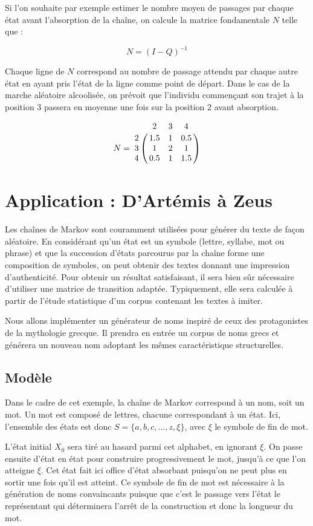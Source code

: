 \documentclass[12pt]{article}
\begin{document}
Si l'on souhaite par exemple estimer le nombre moyen de passages par
chaque état avant l'absorption de la chaîne, on calcule la matrice
fondamentale $N$ telle que :

$$
N = (I - Q)^{-1}
$$

Chaque ligne de $N$ correspond au nombre de passage attendu par chaque
autre état en ayant pris l'état de la ligne comme point de
départ. Dans le cas de la marche aléatoire alcoolisée, on prévoit que
l'individu commençant son trajet à la position 3 passera en moyenne
une fois sur la position 2 avant absorption.

$$
N =
\bordermatrix{
  & 2 & 3 & 4 \cr
  2 & 1.5 & 1 & 0.5 \cr
  3 & 1 & 2 & 1 \cr
  4 & 0.5 & 1 & 1.5
}
$$

\section{Application : D'Artémis à Zeus}

Les chaînes de Markov sont couramment utilisées pour générer du texte
de façon aléatoire. En considérant qu'un état est un symbole (lettre,
syllabe, mot ou phrase) et que la succession d'états parcourus par la
chaîne forme une composition de symboles, on peut obtenir des textes
donnant une impression d'authenticité. Pour obtenir un résultat
satisfaisant, il sera bien sûr nécessaire d'utiliser une matrice de
transition adaptée. Typiquement, elle sera calculée à partir de
l'étude statistique d'un corpus contenant les textes à imiter.

Nous allons implémenter un générateur de noms inspiré de ceux des
protagonistes de la mythologie grecque. Il prendra en entrée un corpus
de noms grecs et générera un nouveau nom adoptant les mêmes
caractéristique structurelles.

\subsection{Modèle}

Dans le cadre de cet exemple, la chaîne de Markov correspond à un nom,
soit un mot. Un mot est composé de lettres, chacune correspondant à un
état. Ici, l'ensemble des états est donc $S = \{a, b, c, \dots, z, \xi
\}$, avec $\xi$ le symbole de fin de mot.

L'état initial $X_0$ sera tiré au hasard parmi cet alphabet, en
ignorant $\xi$. On passe ensuite d'état en état pour construire
progressivement le mot, jusqu'à ce que l'on atteigne $\xi$. Cet état
fait ici office d'état absorbant puisqu'on ne peut plus en sortir une
fois qu'il est atteint. Ce symbole de fin de mot est nécessaire à la
génération de noms convaincants puisque que c'est le passage vers
l'état le représentant qui déterminera l'arrêt de la construction et
donc la longueur du mot.
\end{document}
